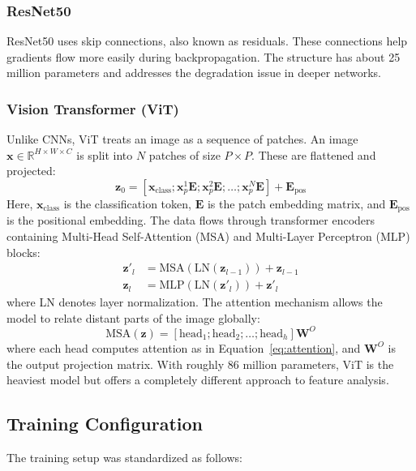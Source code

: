 \documentclass[runningheads]{llncs}
\begin{document}
\subsubsection{ResNet50}
ResNet50 uses skip connections, also known as residuals. These connections help gradients flow more easily during backpropagation. The structure has about 25 million parameters and addresses the degradation issue in deeper networks.

\subsubsection{Vision Transformer (ViT)}
Unlike CNNs, ViT treats an image as a sequence of patches. An image $\mathbf{x} \in \mathbb{R}^{H \times W \times C}$ is split into $N$ patches of size $P \times P$. These are flattened and projected:
\begin{equation}
\mathbf{z}_0 = [\mathbf{x}_{\text{class}}; \mathbf{x}_p^1\mathbf{E}; \mathbf{x}_p^2\mathbf{E}; \ldots; \mathbf{x}_p^N\mathbf{E}] + \mathbf{E}_{\text{pos}}
\label{eq:vit_patches}
\end{equation}
Here, $\mathbf{x}_{\text{class}}$ is the classification token, $\mathbf{E}$ is the patch embedding matrix, and $\mathbf{E}_{\text{pos}}$ is the positional embedding. The data flows through transformer encoders containing Multi-Head Self-Attention (MSA) and Multi-Layer Perceptron (MLP) blocks:
\begin{align}
\mathbf{z}'_l &= \text{MSA}(\text{LN}(\mathbf{z}_{l-1})) + \mathbf{z}_{l-1} \\
\mathbf{z}_l &= \text{MLP}(\text{LN}(\mathbf{z}'_l)) + \mathbf{z}'_l
\label{eq:vit_encoder}
\end{align}
where LN denotes layer normalization. The attention mechanism allows the model to relate distant parts of the image globally:
\begin{equation}
\text{MSA}(\mathbf{z}) = [\text{head}_1; \text{head}_2; \ldots; \text{head}_h]\mathbf{W}^O
\label{eq:vit_msa}
\end{equation}
where each head computes attention as in Equation~\eqref{eq:attention}, and $\mathbf{W}^O$ is the output projection matrix.
With roughly 86 million parameters, ViT is the heaviest model but offers a completely different approach to feature analysis.

\subsection{Training Configuration}
The training setup was standardized as follows:
\end{document}

